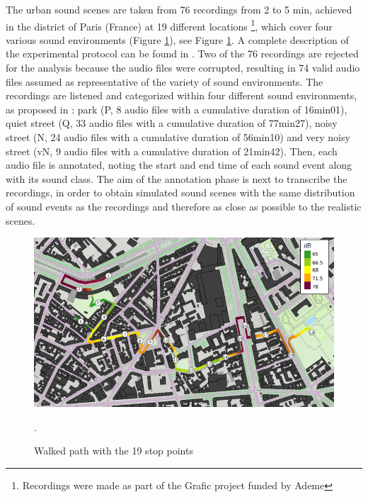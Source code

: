 \documentclass[review,5p,twocolumn,sort&compress,times]{elsarticle}
\begin{document}
The urban sound scenes are taken from 76 recordings from 2 to 5 min, achieved in the  district of Paris (France) at 19 different locations \footnote{Recordings were made as part of the Grafic project funded by Ademe}, which cover four various sound environments (Figure \ref{fig:map_grafic}), see Figure \ref{fig:map_grafic}. A complete description of the experimental protocol can be found in \cite{aumond_modelling_2017}. Two of the 76 recordings are rejected for the analysis because the audio files were corrupted, resulting in 74 valid audio files assumed as representative of the variety of sound environments. The recordings are listened and categorized within four different sound environments, as proposed in \cite{can_describing_2015}: park (P, 8 audio files with a cumulative duration of 16min01), quiet street (Q, 33 audio files with a cumulative duration of 77min27), noisy street (N, 24 audio files with a cumulative duration of 56min10) and very noisy street (vN, 9 audio files with a cumulative duration of 21min42). Then, each audio file is annotated, noting the start and end time of each sound event along with its sound class. The aim of the annotation phase is next to transcribe the recordings, in order to obtain simulated sound scenes with the same distribution of sound events as the recordings and therefore as close as possible to the realistic scenes. 

\begin{figure}[t]
\centering
\includegraphics[width=\linewidth]{./figures/trajet_19pts.png}
\caption{Walked path with the 19 stop points  \cite{aumond_modelling_2017}}.
\label{fig:map_grafic}
\end{figure}
\end{document}
